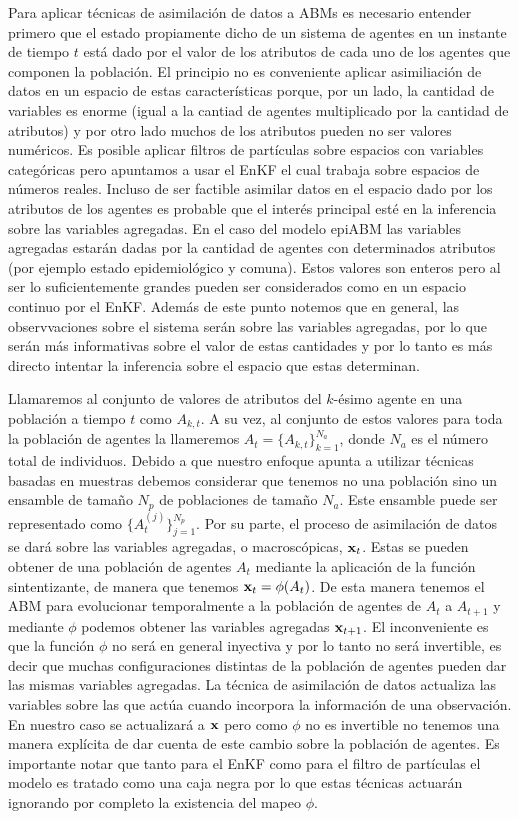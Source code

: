 Para aplicar técnicas de asimilación de datos a ABMs es necesario entender primero que el estado propiamente dicho de un sistema de agentes en un instante de tiempo $t$ está dado por el valor de los atributos de cada uno de los agentes que componen la población. El principio no es conveniente aplicar asimiliación de datos en un espacio de estas características porque, por un lado, la cantidad de variables es enorme (igual a la cantiad de agentes multiplicado por la cantidad de atributos) y por otro lado muchos de los atributos pueden no ser valores numéricos. Es posible aplicar filtros de partículas sobre espacios con variables categóricas pero apuntamos a usar el EnKF el cual trabaja sobre espacios de números reales. Incluso de ser factible asimilar datos en el espacio dado por los atributos de los agentes es probable que el interés principal esté en la inferencia sobre las variables agregadas. En el caso del modelo epiABM las variables agregadas estarán dadas por la cantidad de agentes con determinados atributos (por ejemplo estado epidemiológico y comuna). Estos valores son enteros pero al ser lo suficientemente grandes pueden ser considerados como en un espacio continuo por el EnKF. Además de este punto notemos que en general, las observvaciones sobre el sistema serán sobre las variables agregadas, por lo que serán más informativas sobre el valor de estas cantidades y por lo tanto es más directo intentar la inferencia sobre el espacio que estas determinan.

Llamaremos al conjunto de valores de atributos del $k$-ésimo agente en una población a tiempo $t$ como $A_{k, t}$. A su vez, al conjunto de estos valores para toda la población de agentes la llameremos $A_t = \{ A_{k, t} \}_{k=1}^{N_a}$, donde $N_a$ es el número total de individuos. Debido a que nuestro enfoque apunta a utilizar técnicas basadas en muestras debemos considerar que tenemos no una población sino un ensamble de tamaño $N_p$ de poblaciones de tamaño $N_a$. Este ensamble puede ser representado como $\{ A_{t}^{(j)} \}_{j=1}^{N_p}$. Por su parte, el proceso de asimilación de datos se dará sobre las variables agregadas, o macroscópicas, $\mathbf{x}_t$. Estas se pueden obtener de una población de agentes $A_t$ mediante la aplicación de la función sintentizante, de manera que tenemos $\mathbf{x}_t = \phi (A_t)$. De esta manera tenemos el ABM para evolucionar temporalmente a la población de agentes de $A_t$ a $A_{t+1}$ y mediante $\phi$ podemos obtener las variables agregadas $\mathbf{x}_{t+1}$. El inconveniente es que la función $\phi$ no será en general inyectiva y por lo tanto no será invertible, es decir que muchas configuraciones distintas de la población de agentes pueden dar las mismas variables agregadas. La técnica de asimilación de datos actualiza las variables sobre las que actúa cuando incorpora la información de una observación. En nuestro caso se actualizará a $\mathbf{x}$ pero como $\phi$ no es invertible no tenemos una manera explícita de dar cuenta de este cambio sobre la población de agentes. Es importante notar que tanto para el EnKF como para el filtro de partículas el modelo es tratado como una caja negra por lo que estas técnicas actuarán ignorando por completo la existencia del mapeo $\phi$.

